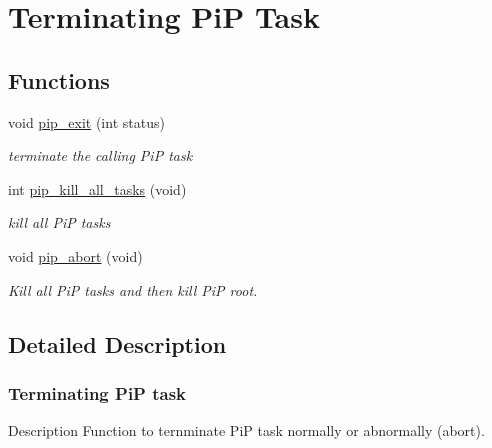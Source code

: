 \hypertarget{group__PiP-5-exit}{\section{Terminating Pi\-P Task}
\label{group__PiP-5-exit}
}
\subsection*{Functions}
\begin{DoxyCompactItemize}
\item 
void \hyperlink{group__PiP-5-exit_ga55171ea8db2c2693f005560e427485c2}{pip\-\_\-exit} (int status)
\begin{DoxyCompactList}\small\item\em terminate the calling Pi\-P task \end{DoxyCompactList}\item 
int \hyperlink{group__PiP-5-exit_gab7ba5cc62101240c68acf07905e36772}{pip\-\_\-kill\-\_\-all\-\_\-tasks} (void)
\begin{DoxyCompactList}\small\item\em kill all Pi\-P tasks \end{DoxyCompactList}\item 
void \hyperlink{group__PiP-5-exit_ga49a4a9ee014ffdaf0c26df18adf965ad}{pip\-\_\-abort} (void)
\begin{DoxyCompactList}\small\item\em Kill all Pi\-P tasks and then kill Pi\-P root. \end{DoxyCompactList}\end{DoxyCompactItemize}


\subsection{Detailed Description}
\hypertarget{pip-exit}{}\subsubsection{Terminating Pi\-P task}\label{pip-exit}
\begin{DoxyParagraph}{Description}
Function to ternminate Pi\-P task normally or abnormally (abort). 
\end{DoxyParagraph}



